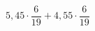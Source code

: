 \begin{ex}[type=calculate_rational]
	\begin{condition}
		\( 5,45\cdot\dfrac{6}{19}+4,55\cdot\dfrac{6}{19} \)
	\end{condition}
	\answer{}
\end{ex}